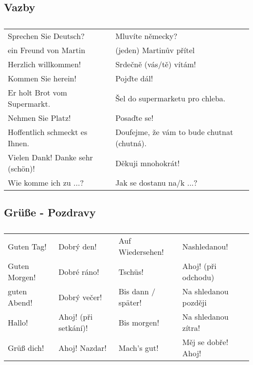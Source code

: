     \subsection*{Vazby}
      \begin{table}[ht!]   %
        \begin{tabular}{ll}
          Sprechen Sie Deutsch?             & Mluvíte německy?                           \\
          ein Freund von Martin             & (jeden) Martinův přítel                    \\
          Herzlich willkommen!              & Srdečně (vás/tě) vítám!                    \\
          Kommen Sie herein!                & Pojďte dál!                                \\
          Er holt Brot vom Supermarkt.      & Šel do supermarketu pro chleba.            \\
          Nehmen Sie Platz!                 & Posaďte se!                                \\
          Hoffentlich schmeckt es Ihnen.    & Doufejme, že vám to bude chutnat (chutná). \\
          Vielen Dank! Danke sehr (schön)!  & Děkuji mnohokrát!                          \\
          Wie komme ich zu ...?             & Jak se dostanu na/k ...?
        \end{tabular}
        \caption*{ }
      \end{table}
  
    \subsection*{Grüße - Pozdravy}
      \begin{table}[ht!]   %
        \begin{tabular}{llll}
          Guten Tag!    & Dobrý den!           & Auf Wiedersehen!   & Nashledanou!           \\
          Guten Morgen! & Dobré ráno!          & Tschüs!            & Ahoj! (při odchodu)    \\
          guten Abend!  & Dobrý večer!         & Bis dann / später! & Na shledanou později   \\
          Hallo!        & Ahoj! (při setkání)! & Bis morgen!        & Na shledanou zítra!    \\
          Grüß dich!    & Ahoj! Nazdar!        & Mach's gut!        & Měj se dobře! Ahoj!    \\
        \end{tabular}
        \caption*{ }
      \end{table}
      
